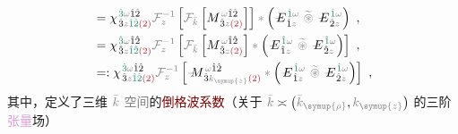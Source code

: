 \begin{subequations}
\begin{align}
	&= {\chi}^{\;\! \textcolor{PineGreen}{\hat{3}} \mathcolor{gray}{\omega} \hat{1} \hat{2} }_{\;\! \hat{3} \mathcolor{gray}{z} \textcolor{PineGreen}{\hat{1} \hat{2}} \textcolor{Maroon}{(2)}} \mathcolor{gray}{\mathcal F_{z}^{-1}} \left[ \mathcolor{gray}{\mathcal F_{\bar{k}}} \left[ M^{\;\! \mathcolor{gray}{\omega} \hat{1} \hat{2} }_{\;\! \hat{3} \mathcolor{gray}{z} \textcolor{Maroon}{(2)} } \right] \right] \mathcolor{gray}{*} \left( \Xint{\mathcolor{gray}{-}}{295}{E}^{\;\!\textcolor{PineGreen}{\hat{1}} \mathcolor{gray}{\omega}}_{\;\! \hat{1} \mathcolor{gray}{z}} ~\mathcolor{gray}{\widetilde \circledast}~ \Xint{\mathcolor{gray}{-}}{295}{E}^{\;\!\textcolor{PineGreen}{\hat{1}} \mathcolor{gray}{\omega}}_{\;\! \hat{2} \mathcolor{gray}{z}} \right) ~, \label{eq:DP^(2)-3_12-spectrum-C4} \\
	&= {\chi}^{\;\! \textcolor{PineGreen}{\hat{3}} \mathcolor{gray}{\omega} \hat{1} \hat{2} }_{\;\! \hat{3} \mathcolor{gray}{z} \textcolor{PineGreen}{\hat{1} \hat{2}} \textcolor{Maroon}{(2)}} \mathcolor{gray}{\mathcal F_{z}^{-1}} \left[ \mathcolor{gray}{\mathcal F_{\bar{k}}} \left[ M^{\;\! \mathcolor{gray}{\omega} \hat{1} \hat{2} }_{\;\! \hat{3} \mathcolor{gray}{z} \textcolor{Maroon}{(2)} } \right] \mathcolor{gray}{*} \left( \Xint{\mathcolor{gray}{-}}{295}{E}^{\;\!\textcolor{PineGreen}{\hat{1}} \mathcolor{gray}{\omega}}_{\;\! \hat{1} \mathcolor{gray}{z}} ~\mathcolor{gray}{\widetilde \circledast}~ \Xint{\mathcolor{gray}{-}}{295}{E}^{\;\!\textcolor{PineGreen}{\hat{1}} \mathcolor{gray}{\omega}}_{\;\! \hat{2} \mathcolor{gray}{z}} \right) \right] ~, \label{eq:DP^(2)-3_12-spectrum-C5} \\
	&=: {\chi}^{\;\! \textcolor{PineGreen}{\hat{3}} \mathcolor{gray}{\omega} \hat{1} \hat{2} }_{\;\! \hat{3} \mathcolor{gray}{z} \textcolor{PineGreen}{\hat{1} \hat{2}} \textcolor{Maroon}{(2)}} \mathcolor{gray}{\mathcal F_{z}^{-1}} \left[ \Xint{\mathcolor{gray}{-}}{18}{M}^{\;\! \mathcolor{gray}{\omega} \hat{1} \hat{2} }_{\;\! \hat{3} \mathcolor{gray}{k_{\symup{z}}} \textcolor{Maroon}{(2)} } \mathcolor{gray}{*} \left( \Xint{\mathcolor{gray}{-}}{295}{E}^{\;\!\textcolor{PineGreen}{\hat{1}} \mathcolor{gray}{\omega}}_{\;\! \hat{1} \mathcolor{gray}{z}} ~\mathcolor{gray}{\widetilde \circledast}~ \Xint{\mathcolor{gray}{-}}{295}{E}^{\;\!\textcolor{PineGreen}{\hat{1}} \mathcolor{gray}{\omega}}_{\;\! \hat{2} \mathcolor{gray}{z}} \right) \right] ~, \label{eq:DP^(2)-3_12-spectrum-C6}
\end{align}
\end{subequations}
其中，定义了三维 $\mathcolor{gray}{\bar{k}}$ \textcolor{gray}{空间}的\textcolor{Maroon}{倒格波系数}（关于 $\mathcolor{gray}{\bar{k}} \asymp \left( \mathcolor{gray}{\bar{k}_{\symup{\rho}}}, \mathcolor{gray}{k_{\symup{z}}} \right)$ 的三阶\textcolor{Plum}{张量}\textcolor{NavyBlue}{场}）
